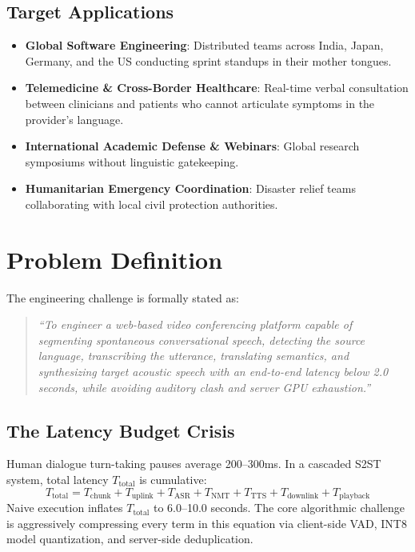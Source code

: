 \documentclass[12pt,a4paper]{report}
\begin{document}
\subsection{Target Applications}
\begin{itemize}
    \item \textbf{Global Software Engineering}: Distributed teams across India, Japan, Germany, and the US conducting sprint standups in their mother tongues.
    \item \textbf{Telemedicine \& Cross-Border Healthcare}: Real-time verbal consultation between clinicians and patients who cannot articulate symptoms in the provider's language.
    \item \textbf{International Academic Defense \& Webinars}: Global research symposiums without linguistic gatekeeping.
    \item \textbf{Humanitarian Emergency Coordination}: Disaster relief teams collaborating with local civil protection authorities.
\end{itemize}

\section{Problem Definition}
The engineering challenge is formally stated as:
\begin{quote}
\textit{``To engineer a web-based video conferencing platform capable of segmenting spontaneous conversational speech, detecting the source language, transcribing the utterance, translating semantics, and synthesizing target acoustic speech with an end-to-end latency below 2.0 seconds, while avoiding auditory clash and server GPU exhaustion.''}
\end{quote}

\subsection{The Latency Budget Crisis}
Human dialogue turn-taking pauses average 200--300ms. In a cascaded S2ST system, total latency $T_{\text{total}}$ is cumulative:
\begin{equation}
T_{\text{total}} = T_{\text{chunk}} + T_{\text{uplink}} + T_{\text{ASR}} + T_{\text{NMT}} + T_{\text{TTS}} + T_{\text{downlink}} + T_{\text{playback}}
\end{equation}
Naive execution inflates $T_{\text{total}}$ to 6.0--10.0 seconds. The core algorithmic challenge is aggressively compressing every term in this equation via client-side VAD, INT8 model quantization, and server-side deduplication.
\end{document}
